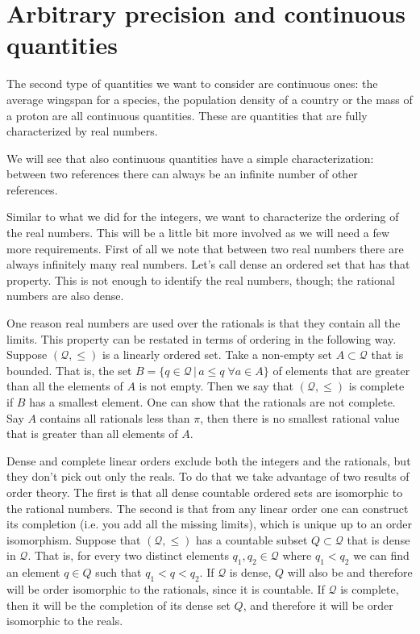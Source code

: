 \section{Arbitrary precision and continuous quantities}

The second type of quantities we want to consider are continuous ones: the average wingspan for a species, the population density of a country or the mass of a proton are all continuous quantities. These are quantities that are fully characterized by real numbers.

We will see that also continuous quantities have a simple characterization: between two references there can always be an infinite number of other references.

Similar to what we did for the integers, we want to characterize the ordering of the real numbers. This will be a little bit more involved as we will need a few more requirements. First of all we note that between two real numbers there are always infinitely many real numbers. Let's call dense an ordered set that has that property. This is not enough to identify the real numbers, though; the rational numbers are also dense.

One reason real numbers are used over the rationals is that they contain all the limits. This property can be restated in terms of ordering in the following way. Suppose $(\mathcal{Q}, \leq)$ is a linearly ordered set. Take a non-empty set $A \subset \mathcal{Q}$ that is bounded. That is, the set $B = \{ q \in \mathcal{Q} \, | \, a \leq q \; \forall a \in A  \}$ of elements that are greater than all the elements of $A$ is not empty. Then we say that $(\mathcal{Q}, \leq)$ is complete if $B$ has a smallest element. One can show that the rationals are not complete. Say $A$ contains all rationals less than $\pi$, then there is no smallest rational value that is greater than all elements of $A$.

Dense and complete linear orders exclude both the integers and the rationals, but they don't pick out only the reals. To do that we take advantage of two results of order theory. The first is that all dense countable ordered sets are isomorphic to the rational numbers. The second is that from any linear order one can construct its completion (i.e. you add all the missing limits), which is unique up to an order isomorphism. Suppose that $(\mathcal{Q}, \leq)$ has a countable subset $Q \subset \mathcal{Q}$ that is dense in $\mathcal{Q}$. That is, for every two distinct elements $q_1, q_2 \in \mathcal{Q}$ where $q_1 < q_2$ we can find an element $q \in Q$ such that $q_1 < q < q_2$. If $\mathcal{Q}$ is dense, $Q$ will also be and therefore will be order isomorphic to the rationals, since it is countable. If $\mathcal{Q}$ is complete, then it will be the completion of its dense set $Q$, and therefore it will be order isomorphic to the reals.

